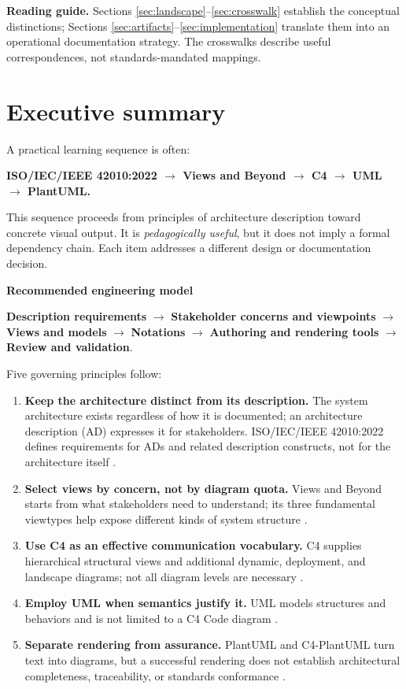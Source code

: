 \documentclass[11pt,letterpaper,oneside]{article}
\begin{document}
\tableofcontents
\vspace{0.25in}
\begin{notebox}
\textbf{Reading guide.} Sections \ref{sec:landscape}--\ref{sec:crosswalk} establish the conceptual distinctions; Sections \ref{sec:artifacts}--\ref{sec:implementation} translate them into an operational documentation strategy. The crosswalks describe useful correspondences, not standards-mandated mappings.
\end{notebox}
\clearpage

\section{Executive summary}\label{sec:summary}
A practical learning sequence is often:
\begin{center}
\textbf{ISO/IEC/IEEE 42010:2022 $\rightarrow$ Views and Beyond $\rightarrow$ C4 $\rightarrow$ UML $\rightarrow$ PlantUML.}
\end{center}
This sequence proceeds from principles of architecture description toward concrete visual output. It is \emph{pedagogically useful}, but it does not imply a formal dependency chain. Each item addresses a different design or documentation decision.

\begin{keybox}
\textbf{Recommended engineering model}\par
\textbf{Description requirements} $\rightarrow$ \textbf{Stakeholder concerns and viewpoints} $\rightarrow$ \textbf{Views and models} $\rightarrow$ \textbf{Notations} $\rightarrow$ \textbf{Authoring and rendering tools} $\rightarrow$ \textbf{Review and validation}.
\end{keybox}

Five governing principles follow:
\begin{enumerate}[label=\arabic*.]
\item \textbf{Keep the architecture distinct from its description.} The system architecture exists regardless of how it is documented; an architecture description (AD) expresses it for stakeholders. ISO/IEC/IEEE 42010:2022 defines requirements for ADs and related description constructs, not for the architecture itself \cite{iso42010}.
\item \textbf{Select views by concern, not by diagram quota.} Views and Beyond starts from what stakeholders need to understand; its three fundamental viewtypes help expose different kinds of system structure \cite{viewsbeyond,sei}. 
\item \textbf{Use C4 as an effective communication vocabulary.} C4 supplies hierarchical structural views and additional dynamic, deployment, and landscape diagrams; not all diagram levels are necessary \cite{c4diagrams}.
\item \textbf{Employ UML when semantics justify it.} UML models structures and behaviors and is not limited to a C4 Code diagram \cite{uml}.
\item \textbf{Separate rendering from assurance.} PlantUML and C4-PlantUML turn text into diagrams, but a successful rendering does not establish architectural completeness, traceability, or standards conformance \cite{plantuml,c4plantuml}.
\end{enumerate}
\end{document}
